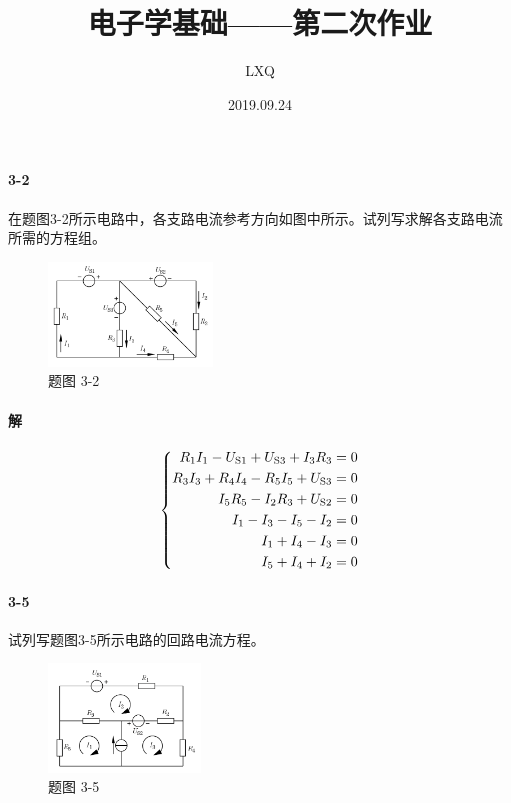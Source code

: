 \documentclass[hyperref, UTF8]{ctexart}
\title{电子学基础——第二次作业}
\author{LXQ}
\date{2019.09.24}
\newcommand{\source}{{\rm S}}
\begin{document}
\maketitle

\paragraph{3-2}\label{3-2}
在题图3-2所示电路中，各支路电流参考方向如图中所示。试列写求解各支路电流所需的方程组。
\begin{figure}[!htb]
\centering
\includegraphics[width=0.388\textwidth]{p3-2.png}
\caption*{题图 3-2}
\end{figure}

\paragraph{解}
\begin{gather*}
    \left\{ \begin{aligned}
    R_1I_1-U_{\source 1}+U_{\source 3}+I_3R_3 & = 0 \\
    R_3I_3+R_4I_4-R_5I_5+U_{\source 3} & = 0 \\
    I_5R_5-I_2R_3+U_{\source 2} & = 0 \\
    I_1-I_3-I_5-I_2 & = 0 \\
    I_1+I_4-I_3 & = 0 \\
    I_5+I_4+I_2 & = 0
    \end{aligned}
    \right.
\end{gather*}

\paragraph{3-5}\label{3-5}
试列写题图3-5所示电路的回路电流方程。

\begin{figure}[!htb]
\centering
\includegraphics[width=0.361\textwidth]{p3-5.png}
\caption*{题图 3-5}
\end{figure}
\end{document}
